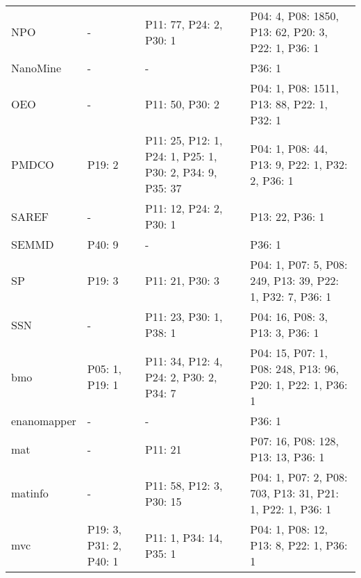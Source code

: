 \begin{tabular}{m{4cm}m{3cm}m{3cm}m{5cm}}
                    NPO &                       - &                                  P11: 77, P24: 2, P30: 1 &         P04: 4, P08: 1850, P13: 62, P20: 3, P22: 1, P36: 1 \\
               NanoMine &                       - &                                                        - &                                                     P36: 1 \\
                    OEO &                       - &                                          P11: 50, P30: 2 &                 P04: 1, P08: 1511, P13: 88, P22: 1, P32: 1 \\
                  PMDCO &                  P19: 2 & P11: 25, P12: 1, P24: 1, P25: 1, P30: 2, P34: 9, P35: 37 &            P04: 1, P08: 44, P13: 9, P22: 1, P32: 2, P36: 1 \\
                  SAREF &                       - &                                  P11: 12, P24: 2, P30: 1 &                                            P13: 22, P36: 1 \\
                  SEMMD &                  P40: 9 &                                                        - &                                                     P36: 1 \\
                     SP &                  P19: 3 &                                          P11: 21, P30: 3 &  P04: 1, P07: 5, P08: 249, P13: 39, P22: 1, P32: 7, P36: 1 \\
                    SSN &                       - &                                  P11: 23, P30: 1, P38: 1 &                            P04: 16, P08: 3, P13: 3, P36: 1 \\
                    bmo &          P05: 1, P19: 1 &                  P11: 34, P12: 4, P24: 2, P30: 2, P34: 7 & P04: 15, P07: 1, P08: 248, P13: 96, P20: 1, P22: 1, P36: 1 \\
            enanomapper &                       - &                                                        - &                                                     P36: 1 \\
                    mat &                       - &                                                  P11: 21 &                         P07: 16, P08: 128, P13: 13, P36: 1 \\
                matinfo &                       - &                                 P11: 58, P12: 3, P30: 15 &  P04: 1, P07: 2, P08: 703, P13: 31, P21: 1, P22: 1, P36: 1 \\
                    mvc &  P19: 3, P31: 2, P40: 1 &                                  P11: 1, P34: 14, P35: 1 &                    P04: 1, P08: 12, P13: 8, P22: 1, P36: 1 \\

\end{tabular}
